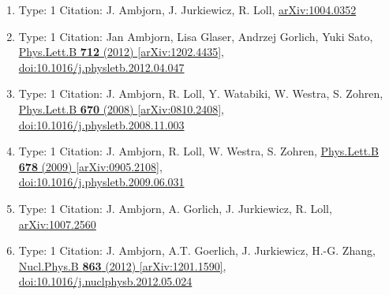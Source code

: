 \documentclass[a4paper,10pt]{article}
\begin{document}
\begin{enumerate}
\begin{enumerate}
  \item Type: 1 Citation: J. Ambjorn, J. Jurkiewicz, R. Loll, \href{https://arxiv.org/abs/1004.0352}{arXiv:1004.0352}
  \item Type: 1 Citation: Jan Ambjorn, Lisa Glaser, Andrzej Gorlich, Yuki Sato, \href{https://www.doi.org/10.1016/j.physletb.2012.04.047}{Phys.Lett.B {\bf 712} (2012) }  \href{https://arxiv.org/abs/1202.4435}{[arXiv:1202.4435]},\\\href{https://www.doi.org/10.1016/j.physletb.2012.04.047}{doi:10.1016/j.physletb.2012.04.047}
  \item Type: 1 Citation: J. Ambjorn, R. Loll, Y. Watabiki, W. Westra, S. Zohren, \href{https://www.doi.org/10.1016/j.physletb.2008.11.003}{Phys.Lett.B {\bf 670} (2008) }  \href{https://arxiv.org/abs/0810.2408}{[arXiv:0810.2408]},\\\href{https://www.doi.org/10.1016/j.physletb.2008.11.003}{doi:10.1016/j.physletb.2008.11.003}
  \item Type: 1 Citation: J. Ambjorn, R. Loll, W. Westra, S. Zohren, \href{https://www.doi.org/10.1016/j.physletb.2009.06.031}{Phys.Lett.B {\bf 678} (2009) }  \href{https://arxiv.org/abs/0905.2108}{[arXiv:0905.2108]},\\\href{https://www.doi.org/10.1016/j.physletb.2009.06.031}{doi:10.1016/j.physletb.2009.06.031}
  \item Type: 1 Citation: J. Ambjorn, A. Gorlich, J. Jurkiewicz, R. Loll, \href{https://arxiv.org/abs/1007.2560}{arXiv:1007.2560}
  \item Type: 1 Citation: J. Ambjorn, A.T. Goerlich, J. Jurkiewicz, H.-G. Zhang, \href{https://www.doi.org/10.1016/j.nuclphysb.2012.05.024}{Nucl.Phys.B {\bf 863} (2012) }  \href{https://arxiv.org/abs/1201.1590}{[arXiv:1201.1590]},\\\href{https://www.doi.org/10.1016/j.nuclphysb.2012.05.024}{doi:10.1016/j.nuclphysb.2012.05.024}

\end{enumerate}
\end{enumerate}
\end{document}
